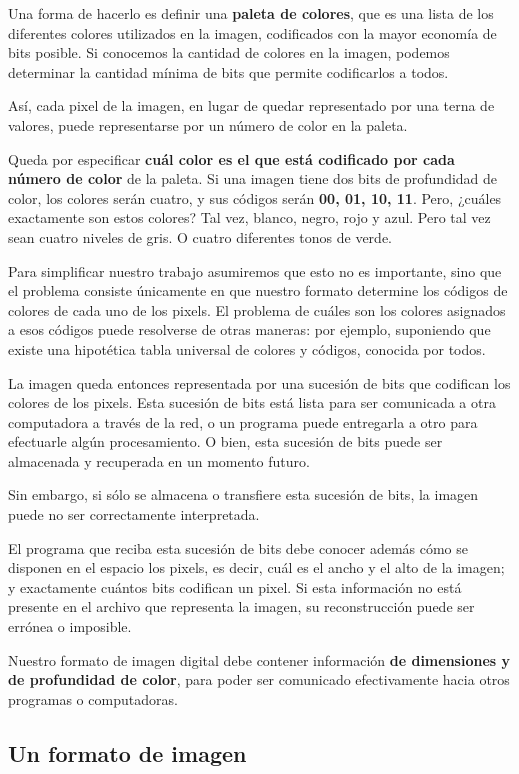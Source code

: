 \documentclass[spanish,a4paper,]{article}
\begin{document}
Una forma de hacerlo es definir una \textbf{paleta de colores}, que es
una lista de los diferentes colores utilizados en la imagen, codificados
con la mayor economía de bits posible. Si conocemos la cantidad de
colores en la imagen, podemos determinar la cantidad mínima de bits que
permite codificarlos a todos.

Así, cada pixel de la imagen, en lugar de quedar representado por una
terna de valores, puede representarse por un número de color en la
paleta.

Queda por especificar \textbf{cuál color es el que está codificado por
cada número de color} de la paleta. Si una imagen tiene dos bits de
profundidad de color, los colores serán cuatro, y sus códigos serán
\textbf{00, 01, 10, 11}. Pero, ¿cuáles exactamente son estos colores?
Tal vez, blanco, negro, rojo y azul. Pero tal vez sean cuatro niveles de
gris. O cuatro diferentes tonos de verde.

Para simplificar nuestro trabajo asumiremos que esto no es importante,
sino que el problema consiste únicamente en que nuestro formato
determine los códigos de colores de cada uno de los pixels. El problema
de cuáles son los colores asignados a esos códigos puede resolverse de
otras maneras: por ejemplo, suponiendo que existe una hipotética tabla
universal de colores y códigos, conocida por todos.

La imagen queda entonces representada por una sucesión de bits que
codifican los colores de los pixels. Esta sucesión de bits está lista
para ser comunicada a otra computadora a través de la red, o un programa
puede entregarla a otro para efectuarle algún procesamiento. O bien,
esta sucesión de bits puede ser almacenada y recuperada en un momento
futuro.

Sin embargo, si sólo se almacena o transfiere esta sucesión de bits, la
imagen puede no ser correctamente interpretada.

El programa que reciba esta sucesión de bits debe conocer además cómo se
disponen en el espacio los pixels, es decir, cuál es el ancho y el alto
de la imagen; y exactamente cuántos bits codifican un pixel. Si esta
información no está presente en el archivo que representa la imagen, su
reconstrucción puede ser errónea o imposible.

Nuestro formato de imagen digital debe contener información \textbf{de
dimensiones y de profundidad de color}, para poder ser comunicado
efectivamente hacia otros programas o computadoras.

\hypertarget{un-formato-de-imagen}{%
\subsection{Un formato de imagen}\label{un-formato-de-imagen}}
\end{document}
